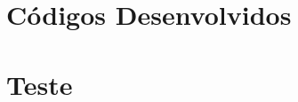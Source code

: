 \documentclass[a4paper, 12pt]{article}
\begin{document}



\newpage

\section{Códigos Desenvolvidos}




\newpage


\pagestyle{empty}




\newpage
\appendix

\section{Teste}
\end{document}

